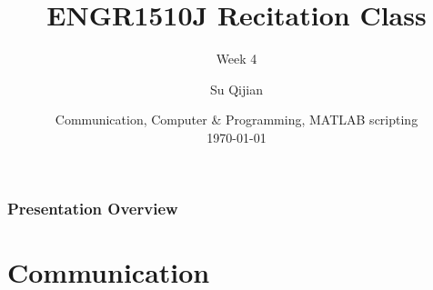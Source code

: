 \documentclass[
	11pt, %
]{beamer}
\title[Computer \& Programming, MATLAB]{ENGR1510J Recitation Class} %
\subtitle{Week 4} %
\author[Su Qijian]{Su Qijian} %
\institute[UM-SJTU JI]{UM-SJTU Joint Institute} %
\date[\today]{Communication, Computer \& Programming, MATLAB scripting \\ \vspace{1cm} \today} %
\begin{document}

\begin{frame}
	\titlepage %
\end{frame}



\begin{frame}
	\frametitle{Presentation Overview} %
	
	\tableofcontents %
\end{frame}


\section{Communication} %
\end{document}
